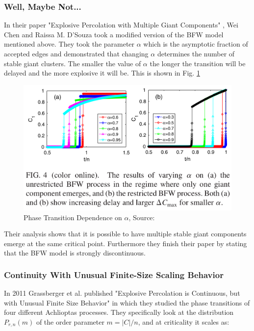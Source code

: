 \subsubsection{Well, Maybe Not...}
In their paper "Explosive Percolation with Multiple Giant Components" \cite{Chen_1}, Wei Chen and Raissa M. D’Souza took a modified version of the BFW model mentioned above.
They took the parameter $\alpha$ which is the asymptotic fraction of accepted edges and demonstrated that changing $\alpha$ determines the number of stable giant clusters.
The smaller the value of $\alpha$ the longer the transition will be delayed and the more explosive it will be.
This is shown in Fig. \ref{fig:bfw_alpha_comparison}

\begin{figure}[H]
	\centering
	\includegraphics[width=350pt]{images/bfw_alpha_comparison.png}
	\caption{Phase Transition Dependence on $\alpha$, Source: \cite{Chen_1}}
	\label{fig:bfw_alpha_comparison}
\end{figure}

Their analysis shows that it is possible to have multiple stable giant components emerge at the same critical point.
Furthermore they finish their paper by stating that the BFW model is strongly discontinuous.



\subsubsection{Continuity With Unusual Finite-Size Scaling Behavior}
In 2011 Grassberger et al. published "Explosive Percolation is Continuous, but with Unusual Finite Size Behavior" \cite{Grassberger_1} in which they studied the phase transitions of four different Achlioptas processes.
They specifically look at the distribution $P_{r, n}(m)$ of the order parameter $m = |C| / n$, and at criticality it scales as:

